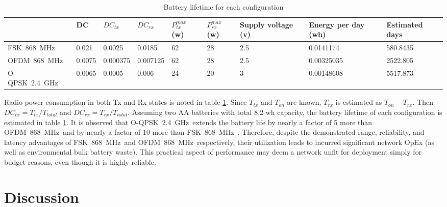 \documentclass[sensors,article,submit,moreauthors,pdftex]{Definitions/mdpi}
\newcommand{\fsk}          {FSK~868~MHz}
\newcommand{\oqpsk}        {O-QPSK~2.4~GHz}
\newcommand{\ofdm}         {OFDM~868~MHz}
\begin{document}
\begin{table}
    \centering
    \begin{tabular}{|l|l|l|l|l|l|l|l|l|}
        \hline
                & DC     & $DC_{tx}$ & $DC_{rx}$ & $P_{tx}^{max}$ (w) & $P_{rx}^{max}$(w) & Supply voltage (v) & Energy per day (wh) & \textbf{Estimated days} \\ \hline
        \fsk\   & 0.021  & 0.0025    & 0.0185    & 62             & 28             & 2.5            & 0.0141174           & 580.8435       \\ \hline
        \ofdm\  & 0.0075 & 0.000375  & 0.007125  & 62             & 28             & 2.5            & 0.00325035          & 2522.805       \\ \hline
        \oqpsk\ & 0.0065 & 0.0005    & 0.006     & 24             & 20             & 3              & 0.00148608          & 5517.873       \\ \hline
    \end{tabular}
    \caption{Battery lifetime for each configuration}
    \label{tab:energy_table}
\end{table}


Radio power consumption in both Tx and Rx states is noted in table \ref{tab:energy_table}.
Since $T_{tx}$ and $T_{on}$ are known, $T_{rx}$ is estimated as $T_{on}-T_{rx}$.
Then $DC_{tx}=T_{tx}/T_{total}$ and $DC_{rx}=T_{rx}/T_{total}$.
Assuming two AA batteries with total 8.2 wh capacity, the battery lifetime of each configuration is estimated in table \ref{tab:energy_table}.
It is observed that \oqpsk\ extends the battery life by nearly a factor of 5 more than \ofdm\ and by nearly a factor of 10  more than \fsk\ .
Therefore, despite the demonstrated range, reliability, and latency advantages of \fsk\ and \ofdm\ respectively, their utilization leads to incurred significant network OpEx (as well as environmental bulk battery waste).
This practical aspect of performance may deem a network unfit for deployment simply for budget reasons, even though it is highly reliable. 

\section{Discussion}
\label{sec:discussion}
\end{document}
